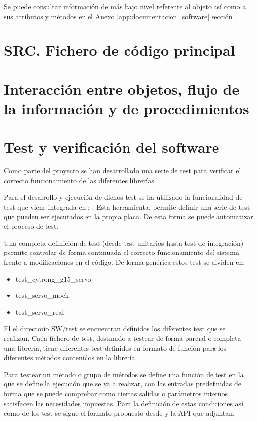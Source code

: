         Se puede consultar información de más bajo nivel referente al objeto  así como a sus atributos y métodos en el Anexo \ref{app:documentacion_software} sección \completar.
        
\section{SRC. Fichero de código principal} \label{sec:SW:src}

\section{Interacción entre objetos, flujo de la información y de procedimientos} \label{sec:SW:interacion_informacion_proced}

\section{Test y verificación del software} \label{sec:SW:test}
    Como parte del proyecto se han desarrollado una serie de test para verificar el correcto funcionamiento de las diferentes librerías.

    Para el desarrollo y ejecución de dichos test se ha utilizado la funcionalidad de test que viene integrada en : . Esta herramienta, permite definir una serie de test que pueden ser ejecutados en la propia placa. De esta forma se puede automatizar el proceso de test.

    Una completa definición de test (desde test unitarios hasta test de integración) permite controlar de forma continuada el correcto funcionamiento del sistema frente a modificaciones en el código. De forma genérica estos test se dividen en:

    \begin{itemize}
        \item test\_cytrong\_g15\_servo 
        \item test\_servo\_mock
        \item test\_servo\_real
    \end{itemize}

    El el directorio SW/test se encuentran definidos los diferentes test que se realizan. Cada fichero de test, destinado a testear de forma parcial o completa una librería, tiene diferentes test definidos en formato de función para los diferentes métodos contenidos en la librería.

    Para testear un método o grupo de métodos se define una función de test en la que se define la ejecución que se va a realizar, con las entradas predefinidas de forma que se puede comprobar como ciertas salidas o parámetros internos satisfacen las necesidades impuestas. Para la definición de estas condiciones así como de los test se sigue el formato propuesto desde  y la API que adjuntan.


